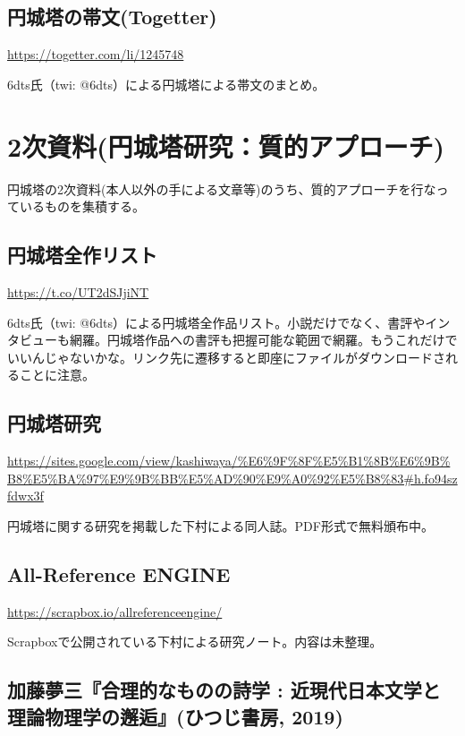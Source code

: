 \documentclass[10pt, a5paper, twoside]{jsarticle}
\theoremstyle{definition}
\begin{document}
		\subsection{円城塔の帯文(Togetter)}

			\url{https://togetter.com/li/1245748}

			6dts氏（twi: @6dts）による円城塔による帯文のまとめ。	

	\section{2次資料(円城塔研究：質的アプローチ)}

		円城塔の2次資料(本人以外の手による文章等)のうち、質的アプローチを行なっているものを集積する。

		\subsection{円城塔全作リスト}
		
			\url{https://t.co/UT2dSJjiNT}

			6dts氏（twi: @6dts）による円城塔全作品リスト。小説だけでなく、書評やインタビューも網羅。円城塔作品への書評も把握可能な範囲で網羅。もうこれだけでいいんじゃないかな。リンク先に遷移すると即座にファイルがダウンロードされることに注意。


		\subsection{円城塔研究}
		
			\url{https://sites.google.com/view/kashiwaya/%E6%9F%8F%E5%B1%8B%E6%9B%B8%E5%BA%97%E9%9B%BB%E5%AD%90%E9%A0%92%E5%B8%83#h.fo94szfdwx3f}

			円城塔に関する研究を掲載した下村による同人誌。PDF形式で無料頒布中。

		\subsection{All-Reference ENGINE}

			\url{https://scrapbox.io/allreferenceengine/}

			Scrapboxで公開されている下村による研究ノート。内容は未整理。

		\subsection{加藤夢三『合理的なものの詩学 : 近現代日本文学と理論物理学の邂逅』(ひつじ書房, 2019)}
\end{document}
